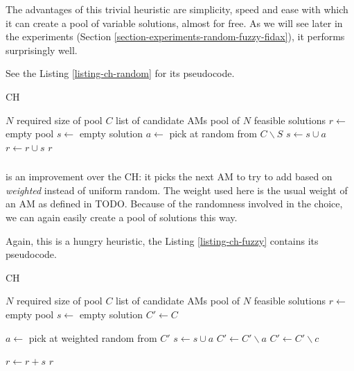 The advantages of this trivial heuristic are simplicity, speed and ease with which it can create a pool of variable solutions, almost for free. As we will see later in the experiments (Section \ref{section-experiments-random-fuzzy-fidax}), it performs surprisingly well.

See the Listing \ref{listing-ch-random} for its pseudocode.

\begin{algorithm}
\caption{ CH}
\label{listing-ch-random}
\begin{algorithmic}
\REQUIRE $N$ required size of pool
\REQUIRE $C$ list of candidate AMs
\ENSURE pool of $N$ feasible solutions
\STATE $r \gets $ empty pool
  \STATE {}
  \STATE $s \gets $ empty solution
    \STATE $a \gets $ pick at random from $C \backslash S$
    \STATE $s \gets s \cup a$
  \ENDWHILE
  \STATE $r \gets r \cup s$
\ENDFOR
\RETURN $r$
\end{algorithmic}
\end{algorithm}

\subsubsection{}
\label{heu-ch-fuzzy}

 is an improvement over the  CH: it picks the next AM to try to add based on \textit{weighted} instead of uniform random. The weight used here is the usual weight of an AM as defined in TODO. Because of the randomness involved in the choice, we can again easily create a pool of solutions this way.

Again, this is a hungry heuristic, the Listing \ref{listing-ch-fuzzy} contains its pseudocode.


\begin{algorithm}
\caption{ CH}
\label{listing-ch-fuzzy}
\begin{algorithmic}
\REQUIRE $N$ required size of pool
\REQUIRE $C$ list of candidate AMs
\ENSURE pool of $N$ feasible solutions
\STATE $r \gets $ empty pool
  \STATE {}
  \STATE $s \gets $ empty solution
  \STATE $C' \gets C$

    \STATE $a \gets $ pick at weighted random from $C'$
      \STATE $s \gets s \cup a$
      \STATE $C' \gets C' \backslash a$
    \ENDIF
        \STATE {}
        \STATE $C' \gets C' \backslash c$
      \ENDIF
    \ENDFOR
  \ENDWHILE

  \STATE $r \gets r + s$
\ENDFOR
\RETURN $r$
\end{algorithmic}
\end{algorithm}

